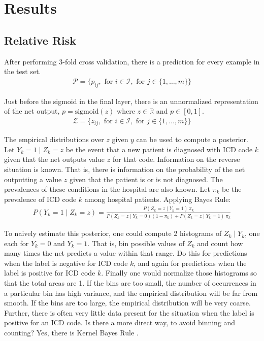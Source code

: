 \pagebreak
\section{Results}

\subsection{Relative Risk}

After performing 3-fold cross validation, there is a prediction for every example in the test set.
\begin{gather}
    \mathcal{P} = \{
        p_{ij},
        \text{ for } i \in \mathcal{I},
        \text{ for } j \in \{ 1, \dots, m \}
    \}
\end{gather}

Just before the sigmoid in the final layer, there is an unnormalized representation of the net output, $p = \text{sigmoid}(z)$ where $z \in \mathbb{R}$ and $p \in [0, 1]$.
\begin{gather}
    \mathcal{Z} = \{
        z_{ij},
        \text{ for } i \in \mathcal{I},
        \text{ for } j \in \{ 1, \dots, m \}
    \}
\end{gather}

The empirical distributions over $z$ given $y$ can be used to compute a posterior.  Let $Y_k = 1 \mid Z_k = z$ be the event that a new patient is diagnosed with ICD code $k$ given that the net outputs value $z$ for that code.  Information on the reverse situation is known.  That is, there is information on the probability of the net outputting a value $z$ given that the patient is or is not diagnosed.  The prevalences of these conditions in the hospital are also known.  Let $\pi_k$ be the prevalence of ICD code $k$ among hospital patients.  Applying Bayes Rule:
\begin{gather}
    P(Y_k = 1 \mid Z_k = z) = \frac
        {P(Z_k = z \mid Y_k = 1) \ \pi_k}
        {P(Z_k = z \mid Y_k = 0) (1 - \pi_k) + P(Z_k = z \mid Y_k = 1) \ \pi_k}
\end{gather}

To naively estimate this posterior, one could compute 2 histograms of $Z_k \mid Y_k$, one each for $Y_k=0$ and $Y_k=1$.  That is, bin possible values of $Z_k$ and count how many times the net predicts a value within that range.  Do this for predictions when the label is negative for ICD code $k$, and again for predictions when the label is positive for ICD code $k$.  Finally one would normalize those histograms so that the total areas are 1.  If the bins are too small, the number of occurrences in a particular bin has high variance, and the empirical distribution will be far from smooth.  If the bins are too large, the empirical distribution will be very coarse.  Further, there is often very little data present for the situation when the label is positive for an ICD code.  Is there a more direct way, to avoid binning and counting?  Yes, there is Kernel Bayes Rule \cite{fukumizu2013kernel}.

